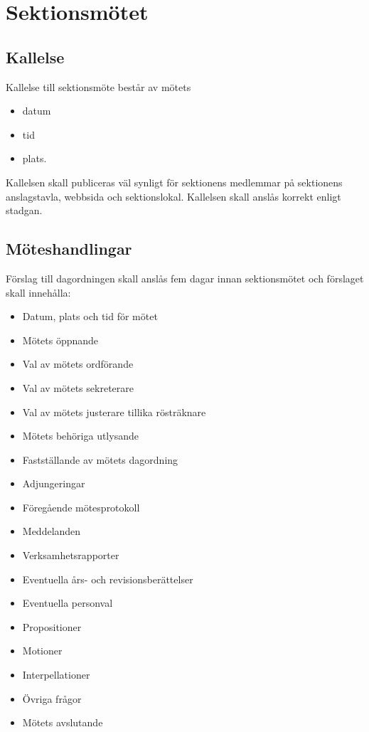 \section{Sektionsmötet}

\subsection{Kallelse}
Kallelse till sektionsmöte består av mötets
\begin{itemize}
    \item datum
    \item tid
    \item plats.
\end{itemize}

Kallelsen skall publiceras väl synligt för sektionens medlemmar på sektionens anslagstavla, webbsida och sektionslokal. Kallelsen skall anslås korrekt enligt stadgan. 

\subsection{Möteshandlingar}
Förslag till dagordningen skall anslås fem dagar innan sektionsmötet och förslaget skall innehålla:

\begin{itemize}
	\item Datum, plats och tid för mötet
	\item Mötets öppnande
	\item Val av mötets ordförande
	\item Val av mötets sekreterare
	\item Val av mötets justerare tillika rösträknare
	\item Mötets behöriga utlysande
	\item Fastställande av mötets dagordning
	\item Adjungeringar
	\item Föregående mötesprotokoll
	\item Meddelanden
	\item Verksamhetsrapporter
	\item Eventuella års- och revisionsberättelser
	\item Eventuella personval
	\item Propositioner
	\item Motioner
	\item Interpellationer
	\item Övriga frågor
	\item Mötets avslutande
\end{itemize}

